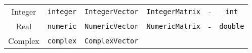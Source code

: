 \documentclass[]{ctexbook}
\begin{document}
\begin{longtable}[]{@{}cccccc@{}}
\begin{minipage}[t]{0.07\columnwidth}
Integer\strut
\end{minipage} & \begin{minipage}[t]{0.07\columnwidth}\centering\strut
\texttt{integer}\strut
\end{minipage} & \begin{minipage}[t]{0.07\columnwidth}\centering\strut
\texttt{IntegerVector}\strut
\end{minipage} & \begin{minipage}[t]{0.07\columnwidth}\centering\strut
\texttt{IntegerMatrix}\strut
\end{minipage} & \begin{minipage}[t]{0.07\columnwidth}\centering\strut
-\strut
\end{minipage} & \begin{minipage}[t]{0.07\columnwidth}\centering\strut
\texttt{int}\strut
\end{minipage}\tabularnewline
\begin{minipage}[t]{0.07\columnwidth}\centering\strut
Real\strut
\end{minipage} & \begin{minipage}[t]{0.07\columnwidth}\centering\strut
\texttt{numeric}\strut
\end{minipage} & \begin{minipage}[t]{0.07\columnwidth}\centering\strut
\texttt{NumericVector}\strut
\end{minipage} & \begin{minipage}[t]{0.07\columnwidth}\centering\strut
\texttt{NumericMatrix}\strut
\end{minipage} & \begin{minipage}[t]{0.07\columnwidth}\centering\strut
-\strut
\end{minipage} & \begin{minipage}[t]{0.07\columnwidth}\centering\strut
\texttt{double}\strut
\end{minipage}\tabularnewline
\begin{minipage}[t]{0.07\columnwidth}\centering\strut
Complex\strut
\end{minipage} & \begin{minipage}[t]{0.07\columnwidth}\centering\strut
\texttt{complex}\strut
\end{minipage} & \begin{minipage}[t]{0.07\columnwidth}\centering\strut
\texttt{ComplexVector}\strut
\end{minipage} & \begin{minipage}[t]{0.07\columnwidth}\centering\strut

\end{minipage}
\end{longtable}
\end{document}
